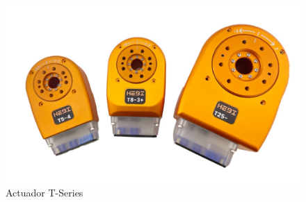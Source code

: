 \begin{figure}[ht!]
	\centering
	\begin{minipage}{0.45\linewidth}
		\centering
		\includegraphics[width=\linewidth]{figs/actuador_T-Series.jpg}
	\end{minipage}
	\caption{Actuador T-Series}
	\label{fig:actuador}
\end{figure}
